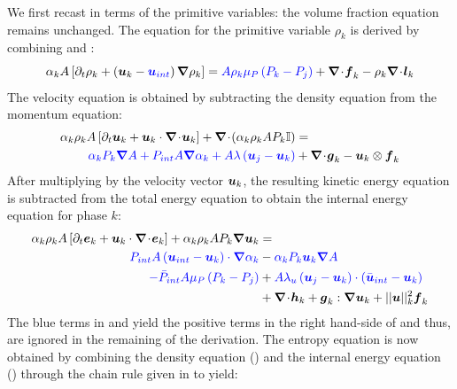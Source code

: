 %
We first recast  in terms of the primitive variables: the volume fraction equation remains unchanged. The equation for the primitive variable $\rho_k$ is derived by combining  and :
%
\begin{equation}\label{eq:rho-7-eqn-model-sect4}
\alpha_k A \left[ \partial_t \rho_k + \left( \boldsymbol u_k - \textcolor{blue}{\boldsymbol u_{int}} \right) \boldsymbol{\nabla} \rho_k \right] = \textcolor{blue}{A \rho_k \mu_P \left( P_k - P_j \right)} + \boldsymbol{\nabla}\! \cdot \! \boldsymbol f_k - \rho_k \boldsymbol{\nabla}\! \cdot \! \boldsymbol l_k
\end{equation}
%
The velocity equation is obtained by subtracting the density equation from the momentum equation:
%
\begin{align}\label{eq:vel-7-eqn-model-sect4}
\alpha_k \rho_k  A \left[ \partial_t \boldsymbol u_k + \boldsymbol u_k \cdot \boldsymbol{\nabla}\! \cdot \! \boldsymbol u_k \right]  + \boldsymbol{\nabla}\! \cdot \! \left( \alpha_k \rho_k A P_k \mathbb{I} \right) &=\nonumber\\
\textcolor{blue}{\alpha_k P_k \boldsymbol{\nabla} A + P_{int} A \boldsymbol{\nabla} \alpha_k + A \lambda \left( \boldsymbol u_j - \boldsymbol u_k \right)} &+ \boldsymbol{\nabla}\! \cdot \! \boldsymbol g_k - \boldsymbol u_k \otimes \boldsymbol f_k
\end{align}
%
After multiplying  by the velocity vector $\boldsymbol u_k$, the resulting kinetic energy equation is subtracted from the total energy equation to obtain the internal energy equation for phase $k$:
%
\begin{align}\label{eq:int-ener-7-eqn-model-sect4}
\alpha_k \rho_k  A \left[ \partial_t \boldsymbol e_k + \boldsymbol u_k \cdot \boldsymbol{\nabla}\! \cdot \! \boldsymbol e_k \right]  + \alpha_k \rho_k A P_k \boldsymbol{\nabla} \boldsymbol u_k &=\nonumber\\
\textcolor{blue}{P_{int} A \left(\boldsymbol u_{int}-\boldsymbol u_k \right) \cdot \boldsymbol{\nabla} \alpha_k} &-  \textcolor{blue}{\alpha_k P_k \boldsymbol u_k \boldsymbol{\nabla} A} \nonumber \\ 
\textcolor{blue}{-\bar{P}_{int} A \mu_P \left(P_k-P_j \right)} &+ \textcolor{blue}{A \lambda_u \left(\boldsymbol u_j-\boldsymbol u_k  \right) \cdot \left(\bar{\boldsymbol u}_{int}- \boldsymbol u_k \right)}\nonumber \\
&+ \boldsymbol{\nabla}\! \cdot \! \boldsymbol h_k + \boldsymbol g_k : \boldsymbol{\nabla} \boldsymbol u_k + || \boldsymbol u ||^2_k \boldsymbol f_k
\end{align}
%
The blue terms in  and  yield the positive terms in the right hand-side of  and thus, are ignored in the remaining of the derivation. The entropy equation is now obtained by combining the density equation () and the internal energy equation () through the chain rule given in  to yield:
